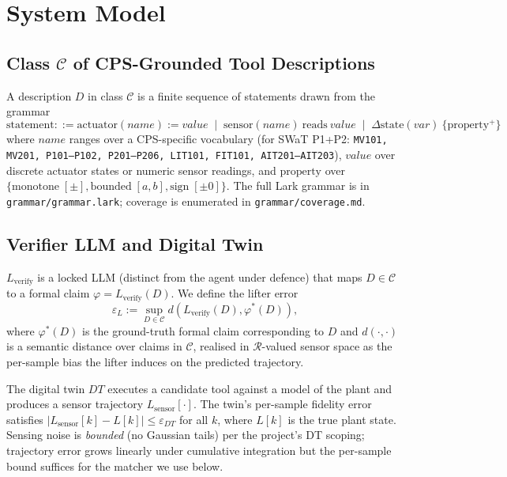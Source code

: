 \documentclass[11pt]{article}
\begin{document}
\section{System Model}
\label{sec:model}

\subsection{Class $\mathcal{C}$ of CPS-Grounded Tool Descriptions}
\label{sec:classC}

A description $D$ in class $\mathcal{C}$ is a finite sequence of statements
drawn from the grammar
\[
\text{statement} ::=
  \text{actuator}(name) := value
  \;\mid\;
  \text{sensor}(name)\ \text{reads}\ value
  \;\mid\;
  \Delta\text{state}(var)\ \{\text{property}^{+}\}
\]
where $name$ ranges over a CPS-specific vocabulary (for SWaT P1+P2:
\texttt{MV101, MV201, P101--P102, P201--P206, LIT101, FIT101, AIT201--AIT203}),
$value$ over discrete actuator states or numeric sensor readings, and
$\text{property}$ over $\{\text{monotone}\;[\pm], \text{bounded}\;[a,b],
\text{sign}\;[\pm 0]\}$. The full Lark grammar is in
\texttt{grammar/grammar.lark}; coverage is enumerated in
\texttt{grammar/coverage.md}.

\subsection{Verifier LLM and Digital Twin}

$L_{\text{verify}}$ is a locked LLM (distinct from the agent under defence)
that maps $D \in \mathcal{C}$ to a formal claim
$\varphi = L_{\text{verify}}(D)$. We define the lifter error
\[
\varepsilon_L := \sup_{D \in \mathcal{C}} d\!\left(L_{\text{verify}}(D),
                                                 \varphi^{*}(D)\right),
\]
where $\varphi^{*}(D)$ is the ground-truth formal claim corresponding to $D$
and $d(\cdot,\cdot)$ is a semantic distance over claims in $\mathcal{C}$,
realised in $\mathcal{R}$-valued sensor space as the per-sample bias the
lifter induces on the predicted trajectory.

The digital twin $\mathit{DT}$ executes a candidate tool against a model of
the plant and produces a sensor trajectory $L_{\text{sensor}}[\cdot]$. The
twin's per-sample fidelity error satisfies $|L_{\text{sensor}}[k] - L[k]| \leq
\varepsilon_{DT}$ for all $k$, where $L[k]$ is the true plant state. Sensing
noise is \emph{bounded} (no Gaussian tails) per the project's DT scoping;
trajectory error grows linearly under cumulative integration but the
per-sample bound suffices for the matcher we use below.
\end{document}
